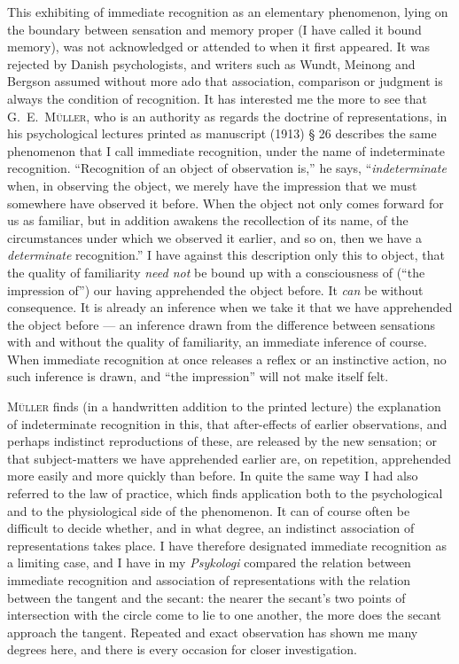 \documentclass[12pt]{book}
\newcommand{\opage}[1]{\marginnote{\footnotesize\textit{[#1]}}}
\begin{document}
This exhibiting of immediate recognition as an elementary phenomenon, lying on
the boundary between sensation and memory proper (I have called it bound
memory), was not acknowledged or attended to when it first appeared. It was
rejected by Danish psychologists, and writers such as Wundt, Meinong and Bergson
assumed without more ado that association, comparison or judgment is always the
condition of recognition. It has interested me the more to see that G.\ E.\
\textsc{Müller}, who is an authority as regards the doctrine of representations,
in his psychological lectures printed as manuscript (1913) § 26 describes the
same phenomenon that I call immediate recognition, under the name of
indeterminate recognition. ``Recognition of an object of observation is,'' he
says, ``\textit{indeterminate} when, in observing the object, we merely have the
impression that we must somewhere have observed it before. When the object not
only comes forward for us as familiar, but in addition awakens the recollection
of its name, of the circumstances under which we observed it earlier, and so on,
then we have a \textit{determinate} recognition.'' I have against this description only
this to object, that the quality of familiarity \textit{need not} be bound up with a
consciousness of (``the impression of'') our having apprehended the object
before. It \textit{can} be without consequence. It is already an inference when we take
it that we have apprehended the object before --- an inference drawn from the
difference between sensations with and without the quality of familiarity, an
immediate inference of course. When immediate recognition at once releases a
reflex or an instinctive action, no such inference is drawn, and ``the
impression'' will not make itself felt.

\textsc{\opage{19}Müller} finds (in a handwritten addition to the printed lecture) the
explanation of indeterminate recognition in this, that after-effects of earlier
observations, and perhaps indistinct reproductions of these, are released by the
new sensation; or that subject-matters we have apprehended earlier are, on
repetition, apprehended more easily and more quickly than before. In quite the
same way I had also referred to the law of practice, which finds application
both to the psychological and to the physiological side of the phenomenon. It
can of course often be difficult to decide whether, and in what degree, an
indistinct association of representations takes place. I have therefore
designated immediate recognition as a limiting case, and I have in my
\textit{Psykologi} compared the relation between immediate recognition and
association of representations with the relation between the tangent and the
secant: the nearer the secant's two points of intersection with the circle come
to lie to one another, the more does the secant approach the tangent. Repeated
and exact observation has shown me many degrees here, and there is every
occasion for closer investigation.
\end{document}
